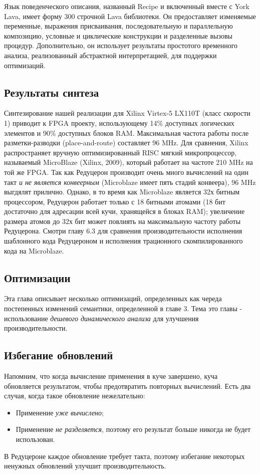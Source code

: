 \documentclass[flenqn, 14pt]{extarticle}
\begin{document}
Язык поведенческого описания, названный Recipe и включенный вместе с York Lava, имеет форму 300 строчной Lava библиотеки. Он предоставляет изменяемые переменные, выражения присваивания, последовательную и параллельную композицию, условные и циклические конструкции и разделенные вызовы процедур. Дополнительно, он использует результаты простотого временного анализа, реализованный абстрактной интерпретацией, для поддержки оптимизаций.

\subsection{Результаты синтеза}
Синтезирование нашей реализации для Xilinx Virtex-5 LX110T (класс скорости 1) приводит к FPGA проекту, использующему 14\% доступных логических элементов и 90\% доступных блоков RAM. Максимальная частота работы после разметки-разводки (place-and-route) составляет 96 MHz. Для сравнения, Xilinx распространяет вручную оптимизированный RISC мягкий микропроцессор, называемый MicroBlaze (Xilinx, 2009), который работает на частоте 210 MHz на той же FPGA. Так как Редуцерон производит очень много вычислений на один такт \textit{и не является конвеерным} (Microblaze имеет пять стадий конвеера), 96 MHz выгдялят прилично. Однако, в то время как Microblaze является 32х битным процессором, Редуцерон работает только с 18 битными атомами (18 бит достаточно для адресации всей кучи, хранящейся в блоках RAM); увеличение размера атомов до 32х бит может повлиять на максимальную частоту работы Редуцерона. Смотри главу 6.3 для сравнения производительности исполнения шаблонного кода Редуцероном и исполнения трационного скомпилированного кода на Microblaze.

\subsection{Оптимизации}
Эта глава описывает несколько оптимизаций, определенных как череда постепенных изменений семантики, определенной в главе 3. Тема это главы - использование \textit{дешевого динамического анализа} для улучшения производительности.

\subsection{Избегание обновлений}
Напомним, что когда вычисление применения в куче завершено, куча обновляется результатом, чтобы предотвратить повторных вычислений. Есть два случая, когда такое обновление нежелательно:
\begin{itemize}
\item Применение \textit{уже вычислено};
\item Применение \textit{не разделяется}, поэтому его результат больше никогда не будет использован.
\end{itemize}
В Редуцероне каждое обновление требует такта, поэтому избегание некоторых ненужных обновлений улучшит производительность.
\end{document}
